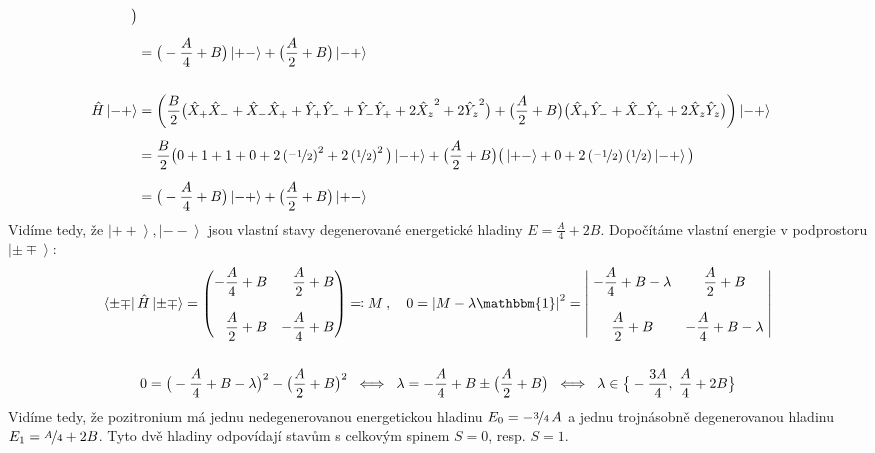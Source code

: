 \documentclass[10pt,a4paper]{article}
\def\ph{\phantom}
\newcommand{\mat}[1]{
    \begin{pmatrix}
        #1
    \end{pmatrix}
}
\newcommand{\bra}[1]{\left< #1 \right|}
\newcommand{\ket}[1]{\left| #1 \right>}
\def\1{\mathbbm{1}}
\begin{document}
\begin{align*}
    \big)
    \\[5pt]
    &= \big( -\frac{A}{4} + B \big) \ket{+-}
    + \big( \frac{A}{2} + B \big) \ket{-+}
    \\\\
    \hat H \ket{-+}
    &= \left(
        \frac{B}{2} \big(
            \hat X_+ \hat X_- + \hat X_- \hat X_+ + \hat Y_+ \hat Y_- + \hat Y_- \hat Y_+
            + 2 {\hat X_z}^2 + 2 {\hat Y_z}^2
        \big)
        + \big( \frac{A}{2} + B \big)\big(
            \hat X_+ \hat Y_- + \hat X_- \hat Y_+
            + 2 \hat X_z \hat Y_z
        \big)
    \right) \ket{-+}
    \\[5pt]
    &=
    \frac{B}{2} \big(
        0 + 1 + 1 + 0
        + 2 \left(\nicefrac{-1}{2}\right)^2 + 2 \left(\nicefrac{1}{2}\right)^2
    \big)
    \ket{-+}
    +
    \big( \frac{A}{2} + B \big)\big(
        \ket{+-} + 0
        + 2 \left(\nicefrac{-1}{2}\right) \left(\nicefrac{1}{2}\right) \ket{-+}
    \big)
    \\[5pt]
    &= \big( -\frac{A}{4} + B \big) \ket{-+}
    + \big( \frac{A}{2} + B \big) \ket{+-}
\end{align*}
Vidíme tedy, že $\ket{++}, \ket{--}$ jsou vlastní stavy degenerované energetické hladiny $E = \frac{A}{4} + 2B$. Dopočítáme vlastní energie v podprostoru $\ket{\pm\mp}$:
\begin{gather*}
    \bra{\pm\mp} \hat H \ket{\pm\mp}
    = \mat{
        -\dfrac{A}{4} + B & \ph{-}\dfrac{A}{2} + B \\[15pt]
        \ph{-}\dfrac{A}{2} + B & -\dfrac{A}{4} + B
    }
    \eqqcolon M
    \: , \quad
    0 = \left| M - \lambda \1 \right|^2
    = \begin{vmatrix}
        \; -\dfrac{A}{4} + B - \lambda & \dfrac{A}{2} + B \; \\[15pt]
        \; \dfrac{A}{2} + B & -\dfrac{A}{4} + B - \lambda \;
    \end{vmatrix}
    \\\\
    0 = \big(-\frac{A}{4} + B - \lambda \big)^2 - \big( \frac{A}{2} + B \big)^2
    \;\iff\;
    \lambda = -\frac{A}{4} + B \pm \big( \frac{A}{2} + B \big)
    \;\iff\;
    \lambda \in \big\{ -\frac{3A}{4}, \; \frac{A}{4} + 2B \big\}
\end{gather*}
Vidíme tedy, že pozitronium má jednu nedegenerovanou energetickou hladinu $E_0 = -\nicefrac{3}{4} \, A$ a jednu trojnásobně degenerovanou hladinu $E_1 = \nicefrac{A}{4} + 2B$. Tyto dvě hladiny odpovídají stavům s celkovým spinem $S=0$, resp. $S=1$.
\end{document}
